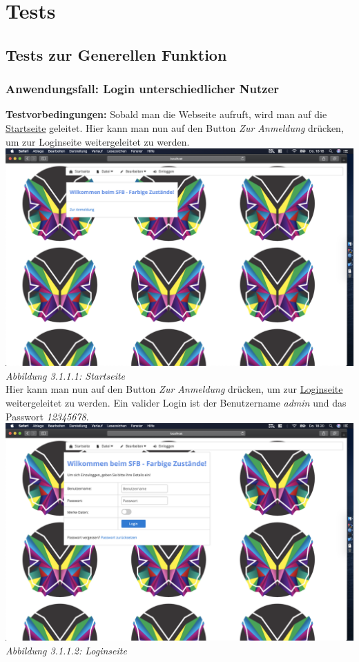 \documentclass[enabledeprecatedfontcommands,fontsize=12pt,paper=a4,twoside]{scrartcl}
\begin{document}
\newpage
\section{Tests}

\subsection{Tests zur Generellen Funktion}

\subsubsection{Anwendungsfall: Login unterschiedlicher Nutzer}

\textbf{Testvorbedingungen:} Sobald man die Webseite aufruft, wird man auf die \hyperlink{sc3.1.1.1}{Startseite}  geleitet. Hier kann man nun auf den Button \textit{Zur Anmeldung} drücken, um zur Loginseite weitergeleitet zu werden. \\

\hypertarget{sc3.1.1.1}{
\includegraphics[width=1\textwidth]{Screenshots/311StartSite.png}
\textit{Abbildung 3.1.1.1: Startseite}
} \\

Hier kann man nun auf den Button \textit{Zur Anmeldung} drücken, um zur \hyperlink{sc3.1.1.2}{Loginseite} weitergeleitet zu werden. Ein valider Login ist der Benutzername \textit{admin} und das Passwort \textit{12345678}. \\

\hypertarget{sc3.1.1.2}{
\includegraphics[width=1\textwidth]{Screenshots/311LoginSite.png}
\textit{Abbildung 3.1.1.2: Loginseite}
} \\
\end{document}

